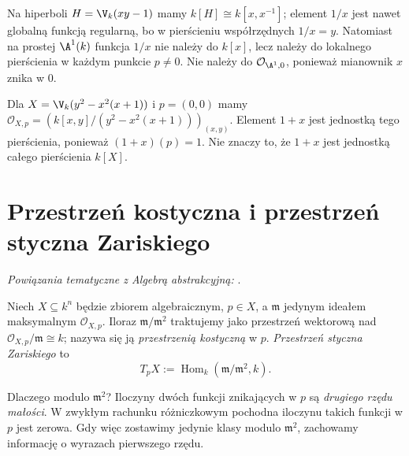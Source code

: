 \begin{przyklad}
Na hiperboli $H=\V_k(xy-1)$ mamy
$k[H]\cong k[x,x^{-1}]$; element $1/x$ jest nawet
globalną funkcją regularną, bo w pierścieniu współrzędnych
$1/x=y$. Natomiast na prostej $\A^1(k)$ funkcja $1/x$
nie należy do $k[x]$, lecz należy do lokalnego pierścienia
w każdym punkcie $p\ne0$. Nie należy do
$\mathcal O_{\A^1,0}$, ponieważ mianownik $x$ znika w $0$.
\end{przyklad}

\begin{przyklad}
Dla $X=\V_k(y^2-x^2(x+1))$ i $p=(0,0)$
mamy $\mathcal O_{X,p}=(k[x,y]/(y^2-x^2(x+1)))_{(x,y)}$.
Element $1+x$ jest jednostką tego pierścienia, ponieważ
$(1+x)(p)=1$. Nie znaczy to, że $1+x$ jest jednostką
całego pierścienia $k[X]$.
\end{przyklad}

\section{Przestrzeń kostyczna i przestrzeń styczna Zariskiego}

\noindent\emph{Powiązania tematyczne z Algebrą abstrakcyjną:} .


\begin{definicja}
\label{def:tangent-zariski}
Niech $X\subseteq k^n$ będzie zbiorem algebraicznym,
$p\in X$, a $\mathfrak m$ jedynym ideałem maksymalnym
$\mathcal O_{X,p}$. Iloraz $\mathfrak m/\mathfrak m^2$
traktujemy jako przestrzeń wektorową nad
$\mathcal O_{X,p}/\mathfrak m\cong k$; nazywa się ją
\emph{przestrzenią kostyczną} w $p$.
\emph{Przestrzeń styczna Zariskiego} to
\[
 T_pX:=\operatorname{Hom}_k(\mathfrak m/\mathfrak m^2,k).
\]
\end{definicja}

Dlaczego modulo $\mathfrak m^2$? Iloczyny dwóch funkcji
znikających w $p$ są \emph{drugiego rzędu małości}.
W zwykłym rachunku różniczkowym pochodna iloczynu
takich funkcji w $p$ jest zerowa. Gdy więc zostawimy
jedynie klasy modulo $\mathfrak m^2$, zachowamy
informację o wyrazach pierwszego rzędu.


